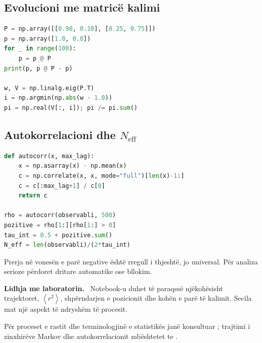 \documentclass[11pt,oneside,openany]{book}
\newcommand{\avg}[1]{\left\langle #1\right\rangle}
\newenvironment{lidhje}{\par\medskip\noindent\textbf{Lidhja me laboratorin.}\ }{\par\medskip}
\begin{document}
\subsection{Evolucioni me matricë kalimi}
\begin{lstlisting}[language=Python,caption={Shpërndarja stacionare e një zinxhiri të fundmë.}]
P = np.array([[0.90, 0.10], [0.25, 0.75]])
p = np.array([1.0, 0.0])
for _ in range(100):
    p = p @ P
print(p, p @ P - p)

w, V = np.linalg.eig(P.T)
i = np.argmin(np.abs(w - 1.0))
pi = np.real(V[:, i]); pi /= pi.sum()
\end{lstlisting}

\subsection{Autokorrelacioni dhe $N_{\mathrm{eff}}$}
\begin{lstlisting}[language=Python,caption={Vlerësim fillestar i kohës së integruar të autokorrelacionit.}]
def autocorr(x, max_lag):
    x = np.asarray(x) - np.mean(x)
    c = np.correlate(x, x, mode="full")[len(x)-1:]
    c = c[:max_lag+1] / c[0]
    return c

rho = autocorr(observabli, 500)
pozitive = rho[1:][rho[1:] > 0]
tau_int = 0.5 + pozitive.sum()
N_eff = len(observabli)/(2*tau_int)
\end{lstlisting}
Prerja në vonesën e parë negative është rregull i thjeshtë, jo universal. Për analiza serioze përdoret dritare automatike ose bllokim.

\begin{lidhje}
Notebook-u duhet të paraqesë njëkohësisht trajektoret, $\avg{r^2}$, shpërndarjen e pozicionit dhe kohën e parë të kalimit. Secila mat një aspekt të ndryshëm të procesit.
\end{lidhje}

Për proceset e rastit dhe terminologjinë e statistikës janë konsultuar \cite{capollari,butka,tasho}; trajtimi i zinxhirëve Markov dhe autokorrelacionit mbështetet te \cite{robert,krauth}.



\end{document}
